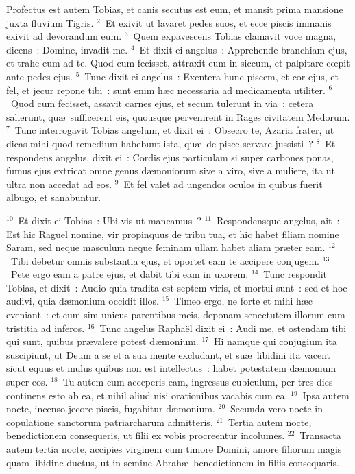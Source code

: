 \lettrine[lines=10,image=true,loversize=0.05,lraise=-0.03]{P}{}rofectus est autem Tobias, et canis secutus est eum, et mansit prima mansione juxta fluvium Tigris.
${}^{2}$~Et exivit ut lavaret pedes suos, et ecce piscis immanis exivit ad devorandum eum.
${}^{3}$~Quem expavescens Tobias clamavit voce magna, dicens~: Domine, invadit me.
${}^{4}$~Et dixit ei angelus~: Apprehende branchiam ejus, et trahe eum ad te. Quod cum fecisset, attraxit eum in siccum, et palpitare cœpit ante pedes ejus.
${}^{5}$~Tunc dixit ei angelus~: Exentera hunc piscem, et cor ejus, et fel, et jecur repone tibi~: sunt enim h\ae c necessaria ad medicamenta utiliter.
${}^{6}$~Quod cum fecisset, assavit carnes ejus, et secum tulerunt in via~: cetera salierunt, qu\ae\ sufficerent eis, quousque pervenirent in Rages civitatem Medorum.
${}^{7}$~Tunc interrogavit Tobias angelum, et dixit ei~: Obsecro te, Azaria frater, ut dicas mihi quod remedium habebunt ista, qu\ae\ de pisce servare jussisti~?
${}^{8}$~Et respondens angelus, dixit ei~: Cordis ejus particulam si super carbones ponas, fumus ejus extricat omne genus d\ae moniorum sive a viro, sive a muliere, ita ut ultra non accedat ad eos.
${}^{9}$~Et fel valet ad ungendos oculos in quibus fuerit albugo, et sanabuntur.


${}^{10}$~Et dixit ei Tobias~: Ubi vis ut maneamus~?
${}^{11}$~Respondensque angelus, ait~: Est hic Raguel nomine, vir propinquus de tribu tua, et hic habet filiam nomine Saram, sed neque masculum neque feminam ullam habet aliam pr\ae ter eam.
${}^{12}$~Tibi debetur omnis substantia ejus, et oportet eam te accipere conjugem.
${}^{13}$~Pete ergo eam a patre ejus, et dabit tibi eam in uxorem.
${}^{14}$~Tunc respondit Tobias, et dixit~: Audio quia tradita est septem viris, et mortui sunt~: sed et hoc audivi, quia d\ae monium occidit illos.
${}^{15}$~Timeo ergo, ne forte et mihi h\ae c eveniant~: et cum sim unicus parentibus meis, deponam senectutem illorum cum tristitia ad inferos.
${}^{16}$~Tunc angelus Rapha\"el dixit ei~: Audi me, et ostendam tibi qui sunt, quibus pr\ae valere potest d\ae monium.
${}^{17}$~Hi namque qui conjugium ita suscipiunt, ut Deum a se et a sua mente excludant, et su\ae\ libidini ita vacent sicut equus et mulus quibus non est intellectus~: habet potestatem d\ae monium super eos.
${}^{18}$~Tu autem cum acceperis eam, ingressus cubiculum, per tres dies continens esto ab ea, et nihil aliud nisi orationibus vacabis cum ea.
${}^{19}$~Ipsa autem nocte, incenso jecore piscis, fugabitur d\ae monium.
${}^{20}$~Secunda vero nocte in copulatione sanctorum patriarcharum admitteris.
${}^{21}$~Tertia autem nocte, benedictionem consequeris, ut filii ex vobis procreentur incolumes.
${}^{22}$~Transacta autem tertia nocte, accipies virginem cum timore Domini, amore filiorum magis quam libidine ductus, ut in semine Abrah\ae\ benedictionem in filiis consequaris.

